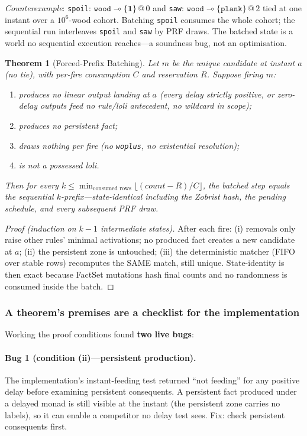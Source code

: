 \documentclass[11pt]{article}
\makeatletter
\newcommand{\lax}[2]{\{#1\}\mathbin{@}#2}       %
\newcommand{\loli}{\multimap}                    %
\newtheorem{theorem}{Theorem}[section]
\theoremstyle{definition}
\theoremstyle{remark}
\makeatother
\begin{document}
\textit{Counterexample}: \texttt{spoil}: $\texttt{wood} \loli \lax{\mathbf{1}}{0}$ and
\texttt{saw}: $\texttt{wood} \loli \lax{\texttt{plank}}{2}$ tied at one instant
over a $10^6$-wood cohort.  Batching \texttt{spoil} consumes the whole cohort; the
sequential run interleaves \texttt{spoil} and \texttt{saw} by PRF draws.  The
batched state is a world no sequential execution reaches---a soundness bug, not an
optimisation.

\begin{theorem}[Forced-Prefix Batching]
\label{thm:forced-prefix}
Let $m$ be the unique candidate at instant $a$ (no tie), with per-fire consumption
$C$ and reservation $R$.  Suppose firing $m$:
\begin{enumerate}
\item[(i)] produces no linear output landing at $a$ (every delay strictly
  positive, or zero-delay outputs feed no rule/loli antecedent, no wildcard in
  scope);
\item[(ii)] produces no persistent fact;
\item[(iii)] draws nothing per fire (no \texttt{woplus}, no existential
  resolution);
\item[(iv)] is not a possessed loli.
\end{enumerate}
Then for every $k \leq \min_{\text{consumed rows}} \lfloor(\mathit{count} -
R)/C\rfloor$, the batched step equals the sequential $k$-prefix---state-identical
including the Zobrist hash, the pending schedule, and every subsequent PRF draw.
\end{theorem}
\begin{proof}[Proof (induction on $k-1$ intermediate states)]
After each fire: (i) removals only raise other rules' minimal activations; no
produced fact creates a new candidate at $a$; (ii) the persistent zone is
untouched; (iii) the deterministic matcher (FIFO over stable rows) recomputes the
SAME match, still unique.  State-identity is then exact because FactSet mutations
hash final counts and no randomness is consumed inside the batch.
\end{proof}

\subsubsection*{A theorem's premises are a checklist for the implementation}

Working the proof conditions found \textbf{two live bugs}:

\paragraph{Bug 1 (condition (ii)---persistent production).} The implementation's
instant-feeding test returned ``not feeding'' for any positive delay before
examining persistent consequents.  A persistent fact produced under a delayed monad
is still visible at the instant (the persistent zone carries no labels), so it can
enable a competitor no delay test sees.  Fix: check persistent consequents first.
\end{document}
